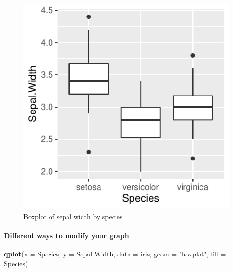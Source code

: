 \documentclass[]{article}
\newenvironment{Shaded}{\begin{snugshade}}{\end{snugshade}}
\newcommand{\DataTypeTok}[1]{\textcolor[rgb]{0.13,0.29,0.53}{#1}}
\newcommand{\KeywordTok}[1]{\textcolor[rgb]{0.13,0.29,0.53}{\textbf{#1}}}
\newcommand{\NormalTok}[1]{#1}
\newcommand{\StringTok}[1]{\textcolor[rgb]{0.31,0.60,0.02}{#1}}
\let\oldparagraph\paragraph
\renewcommand{\paragraph}[1]{\oldparagraph{#1}\mbox{}}
\begin{document}
\begin{figure}
\centering
\includegraphics{Week3Answers_files/figure-latex/unnamed-chunk-9-1.pdf}
\caption{Boxplot of sepal width by species}
\end{figure}

\hypertarget{different-ways-to-modify-your-graph}{%
\paragraph{Different ways to modify your
graph}\label{different-ways-to-modify-your-graph}}

\begin{Shaded}
\begin{Highlighting}[]
\KeywordTok{qplot}\NormalTok{(}\DataTypeTok{x =}\NormalTok{ Species, }\DataTypeTok{y =}\NormalTok{ Sepal.Width, }\DataTypeTok{data =}\NormalTok{ iris, }\DataTypeTok{geom =} \StringTok{"boxplot"}\NormalTok{, }\DataTypeTok{fill =}\NormalTok{ Species)}
\end{Highlighting}
\end{Shaded}
\end{document}
